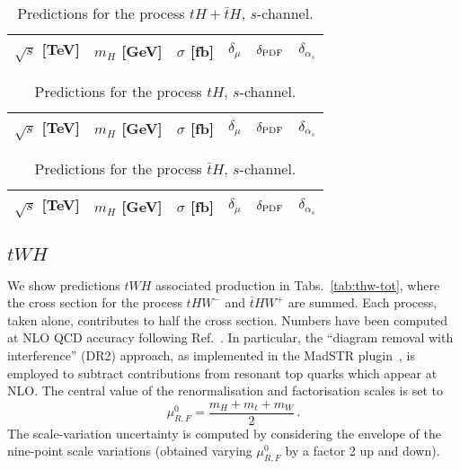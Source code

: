 \documentclass[a4paper,usenames,dvipsnames,11pt]{article}
\begin{document}
\begin{table}
    \centering
    \begin{tabular}{cccccc}
        $\sqrt{s}$ [TeV]  &  $m_H$ [GeV]  &  $\sigma$ [fb]  & $\delta_{\mu}$   &  $\delta_{\rm PDF}$   & $\delta_{\alpha_s}$\\
        \hline
          
    \end{tabular}
    \caption{\label{tab:th-s-tot} Predictions for the process $tH + \bar t H$, $s$-channel.}
\end{table}
%
\begin{table}
    \centering
    \begin{tabular}{cccccc}
        $\sqrt{s}$ [TeV]  &  $m_H$ [GeV]  &  $\sigma$ [fb]  & $\delta_{\mu}$   &  $\delta_{\rm PDF}$   & $\delta_{\alpha_s}$\\
        \hline
          
    \end{tabular}
    \caption{\label{tab:th-s-top} Predictions for the process $tH$, $s$-channel.}
\end{table}
%
\begin{table}
    \centering
    \begin{tabular}{cccccc}
        $\sqrt{s}$ [TeV]  &  $m_H$ [GeV]  &  $\sigma$ [fb]  & $\delta_{\mu}$   &  $\delta_{\rm PDF}$   & $\delta_{\alpha_s}$\\
        \hline
          
    \end{tabular}
    \caption{\label{tab:th-s-atop} Predictions for the process $\bar tH$, $s$-channel.}
\end{table}

\subsection{$tWH$}
We show predictions $tWH$ associated production in Tabs.~\ref{tab:thw-tot}, where the cross section for the process $tHW^-$ and $\bar t HW^+$ are summed. Each
process, taken alone, contributes to half the cross section. Numbers have been computed at NLO QCD accuracy following Ref.~\cite{Demartin:2016axk}. In particular, the ``diagram removal with interference'' (DR2)
approach, as implemented in the {\sc MadSTR} plugin~\cite{Frixione:2019fxg}, is employed to subtract contributions from resonant top quarks which appear at NLO.
The central value of the renormalisation and factorisation scales is set to
\begin{equation}
    \mu_{R,F}^0 = \frac{m_H+m_t+m_W}{2}\,.
\end{equation}
The scale-variation uncertainty is computed by considering the envelope of the 
nine-point scale variations (obtained varying $ \mu_{R,F}^0$ by a factor 2 up and down).
\end{document}

